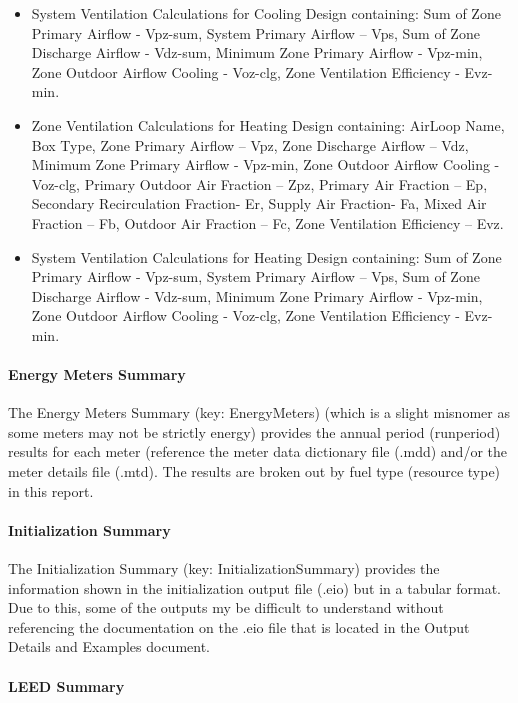 \begin{itemize}
\item
  System Ventilation Calculations for Cooling Design containing: Sum of Zone Primary Airflow - Vpz-sum, System Primary Airflow -- Vps, Sum of Zone Discharge Airflow - Vdz-sum, Minimum Zone Primary Airflow - Vpz-min, Zone Outdoor Airflow Cooling - Voz-clg, Zone Ventilation Efficiency - Evz-min.
\item
  Zone Ventilation Calculations for Heating Design containing: AirLoop Name, Box Type, Zone Primary Airflow -- Vpz, Zone Discharge Airflow -- Vdz, Minimum Zone Primary Airflow - Vpz-min, Zone Outdoor Airflow Cooling - Voz-clg, Primary Outdoor Air Fraction -- Zpz, Primary Air Fraction -- Ep, Secondary Recirculation Fraction- Er, Supply Air Fraction- Fa, Mixed Air Fraction -- Fb, Outdoor Air Fraction -- Fc, Zone Ventilation Efficiency -- Evz.
\item
  System Ventilation Calculations for Heating Design containing: Sum of Zone Primary Airflow - Vpz-sum, System Primary Airflow -- Vps, Sum of Zone Discharge Airflow - Vdz-sum, Minimum Zone Primary Airflow - Vpz-min, Zone Outdoor Airflow Cooling - Voz-clg, Zone Ventilation Efficiency - Evz-min.
\end{itemize}

\paragraph{Energy Meters Summary}\label{energy-meters-summary}

The Energy Meters Summary (key: EnergyMeters) (which is a slight misnomer as some meters may not be strictly energy) provides the annual period (runperiod) results for each meter (reference the meter data dictionary file (.mdd) and/or the meter details file (.mtd). The results are broken out by fuel type (resource type) in this report.

\paragraph{Initialization Summary}\label{initialization-summary}

The Initialization Summary (key: InitializationSummary) provides the information shown in the initialization output file (.eio) but in a tabular format. Due to this, some of the outputs my be difficult to understand without referencing the documentation on the .eio file that is located in the Output Details and Examples document.

\paragraph{LEED Summary}\label{leed-summary}

